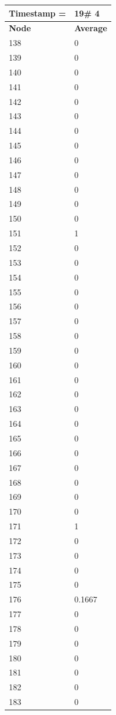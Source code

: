 \begin{tabular}{|l||l|}
\hline
\textbf{Timestamp =} & \textbf{19}\# 4\\\hline
	\textbf{Node} & \textbf{Average} \\ \hline
\hline
	138 & 0 \\ \hline
	139 & 0 \\ \hline
	140 & 0 \\ \hline
	141 & 0 \\ \hline
	142 & 0 \\ \hline
	143 & 0 \\ \hline
	144 & 0 \\ \hline
	145 & 0 \\ \hline
	146 & 0 \\ \hline
	147 & 0 \\ \hline
	148 & 0 \\ \hline
	149 & 0 \\ \hline
	150 & 0 \\ \hline
	151 & 1 \\ \hline
	152 & 0 \\ \hline
	153 & 0 \\ \hline
	154 & 0 \\ \hline
	155 & 0 \\ \hline
	156 & 0 \\ \hline
	157 & 0 \\ \hline
	158 & 0 \\ \hline
	159 & 0 \\ \hline
	160 & 0 \\ \hline
	161 & 0 \\ \hline
	162 & 0 \\ \hline
	163 & 0 \\ \hline
	164 & 0 \\ \hline
	165 & 0 \\ \hline
	166 & 0 \\ \hline
	167 & 0 \\ \hline
	168 & 0 \\ \hline
	169 & 0 \\ \hline
	170 & 0 \\ \hline
	171 & 1 \\ \hline
	172 & 0 \\ \hline
	173 & 0 \\ \hline
	174 & 0 \\ \hline
	175 & 0 \\ \hline
	176 & 0.1667 \\ \hline
	177 & 0 \\ \hline
	178 & 0 \\ \hline
	179 & 0 \\ \hline
	180 & 0 \\ \hline
	181 & 0 \\ \hline
	182 & 0 \\ \hline
	183 & 0 \\ \hline
\end{tabular}
